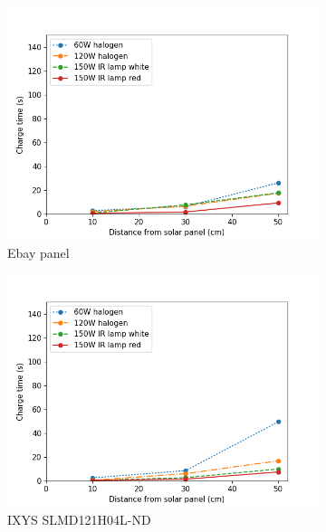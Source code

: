 \begin{figure}
	\centering
	\begin{subfigure}[b]{0.49\textwidth}
		\includegraphics[width=\textwidth]{pics/light_experiment_figure1.png}
		\caption{Ebay panel}
		\label{fig:light_exp1}
	\end{subfigure}
	\begin{subfigure}[b]{0.49\textwidth}
		\includegraphics[width=\textwidth]{pics/light_experiment_figure2.png}
		\caption{IXYS SLMD121H04L-ND}
		\label{fig:light_exp2}
	\end{subfigure}
	\begin{subfigure}[b]{0.49\textwidth}

\end{subfigure}
\end{figure}
